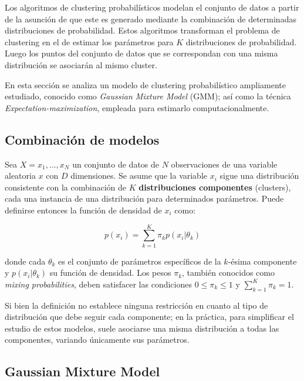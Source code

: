 Los algoritmos de clustering probabilísticos modelan el conjunto de datos a partir de la asunción de que este es generado mediante la combinación de determinadas distribuciones de probabilidad.
Estos algoritmos transforman el problema de clustering en el de estimar los parámetros para $K$ distribuciones de probabilidad.
Luego los puntos del conjunto de datos que se correspondan con una misma distribución se asociarán al mismo cluster.

En esta sección se analiza un modelo de clustering probabilístico ampliamente estudiado, conocido como \textit{Gaussian Mixture Model} (GMM);
así como la técnica \textit{Expectation-maximization}, empleada para estimarlo computacionalmente.

\subsection{Combinación de modelos}\label{subsec:mixtureModels}

Sea $X={x_1,\dots,x_N}$ un conjunto de datos de $N$ observaciones de una variable aleatoria $x$ con $D$ dimensiones.
Se asume que la variable $x_i$ sigue una distribución consistente con la combinación de $K$ \textbf{distribuciones componentes} (clusters), cada una instancia de una distribución para determinados parámetros.
Puede definirse entonces la función de densidad de $x_i$ como:

\begin{equation}
    \label{eq:mixtureModels}
    p(x_i)=\sum_{k=1}^{K}{\pi_k p(x_i|\theta_k)}
\end{equation}

\noindent
donde cada $\theta_k$ es el conjunto de parámetros específicos de la $k$-ésima componente y $p(x_i|\theta_k)$ su función de densidad.
Los pesos $\pi_k$, también conocidos como \textit{mixing probabilities}, deben satisfacer las condiciones $0\leq \pi_k \leq 1$ y $\sum_{k=1}^{K}{\pi_k}=1$.

Si bien la definición no establece ninguna restricción en cuanto al tipo de distribución que debe seguir cada componente;
en la práctica, para simplificar el estudio de estos modelos, suele asociarse una misma distribución a todas las componentes, variando únicamente sus parámetros.

\subsection{Gaussian Mixture Model}\label{subsec:GMM}

